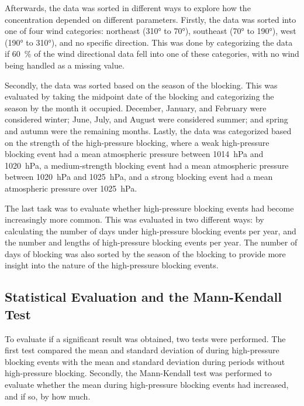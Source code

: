 Afterwards, the data was sorted in different ways to explore how the \PM concentration depended on different parameters. Firstly, the data was sorted into one of four wind categories: northeast (310° to 70°), southeast (70° to 190°), west (190° to 310°), and no specific direction. This was done by categorizing the data if \SI{60}{\%} of the wind directional data fell into one of these categories, with no wind being handled as a missing value.

Secondly, the data was sorted based on the season of the blocking. This was evaluated by taking the midpoint date of the blocking and categorizing the season by the month it occupied. December, January, and February were considered winter; June, July, and August were considered summer; and spring and autumn were the remaining months. Lastly, the data was categorized based on the strength of the high-pressure blocking, where a weak high-pressure blocking event had a mean atmospheric pressure between \SI{1014}{\hecto\pascal} and \SI{1020}{\hecto\pascal}, a medium-strength blocking event had a mean atmospheric pressure between \SI{1020}{\hecto\pascal} and \SI{1025}{\hecto\pascal}, and a strong blocking event had a mean atmospheric pressure over \SI{1025}{\hecto\pascal}.

The last task was to evaluate whether high-pressure blocking events had become increasingly more common. This was evaluated in two different ways: by calculating the number of days under high-pressure blocking events per year, and the number and lengths of high-pressure blocking events per year. The number of days of blocking was also sorted by the season of the blocking to provide more insight into the nature of the high-pressure blocking events. 

\subsection{Statistical Evaluation and the Mann-Kendall Test}
To evaluate if a significant result was obtained, two tests were performed. The first test compared the mean and standard deviation of \PM during high-pressure blocking events with the mean and standard deviation during periods without high-pressure blocking. Secondly, the Mann-Kendall test was performed to evaluate whether the \PM mean during high-pressure blocking events had increased, and if so, by how much. 

